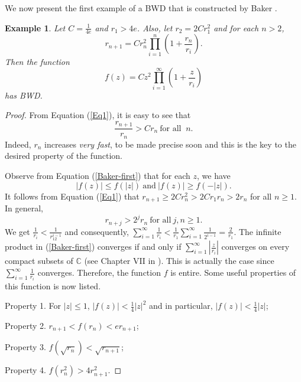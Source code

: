 \documentclass[11pt,a4paper]{article}
\newtheorem{example}{Example}[section]
\begin{document}
We now present the first example of a BWD that is constructed by Baker \cite{Baker 1963}. 	
\begin{example}\label{1st exm}
	 Let $C=\frac{1}{4e}$ and $r_1> 4e$. Also, let $r_2=2Cr^2_1$ and for each $n>2$,  \begin{equation}\label{Eq1}
		r_{n+1}=Cr_n^2\prod_{i=1}^{n}\left(1+\frac{r_n}{r_i}\right).
	\end{equation}	
	Then the function \begin{equation}\label{Baker-first}
		f(z)=Cz^2\prod_{i=1}^{\infty}\left(1+\frac{z}{r_i}\right) 
	\end{equation} has BWD.		
	\end{example}
	\begin{proof}
		

 From Equation (\ref{Eq1}), it is easy to see that \begin{equation}\label{Eq2}
\frac{r_{n+1}}{r_n}>Cr_n ~\mbox{for all }~ n.
\end{equation} 
Indeed, $r_n$ increases \textit{very fast}, to be made precise soon and this is the key to the desired property of the function.
\par Observe from Equation (\ref{Baker-first}) that for each $z$, we have
 \begin{equation}\label{Eq5}
|f(z)|\leq f(|z|) ~\mbox{and}~ |f(z)|\geq  f(-|z|).
\end{equation}
It follows from Equation (\ref{Eq1}) that $r_{n+1}\geq 2Cr^2_n>2Cr_1r_n>2r_n$ for all $n\geq 1$. In general, 
\begin{equation}
	 r_{n+j}>2^{j}r_n ~\mbox{for all}~ j, n\geq 1.
\label{growth-rn}\end{equation}
We get $\frac{1}{r_i}<\frac{1}{r_12^{i-1}}$ and consequently, $\sum_{i=1}^{\infty}\frac{1}{r_i}<\frac{1}{r_1}\sum_{i=1}^{\infty}\frac{1}{2^{i-1}}=\frac{2}{r_1}$. The infinite product in (\ref{Baker-first}) converges if and only if $\sum_{i=1}^{\infty}\left|\frac{z}{r_i}\right|$ converges on every compact subsets of $\mathbb{C}$ (see Chapter VII in \cite{Noop 1947}). This is actually the case since $\sum_{i=1}^{\infty}\frac{1}{r_i}$ converges. Therefore, the function $f$ is entire. Some useful properties of this function is now listed.
		\par Property 1. For $|z|\leq 1$, $|f(z)|<\frac{1}{4}|z|^2$ and in particular, $|f(z)|<\frac{1}{4}|z|$;
		\par Property 2. $r_{n+1}<f(r_n)<er_{n+1}$;
	    \par Property 3. $f({\sqrt{r_n}})<{\sqrt{r_{n+1}}}$;
		\par Property 4. $f({r^2_n})>4{r^2_{n+1}}$.


\end{proof}
\end{document}
